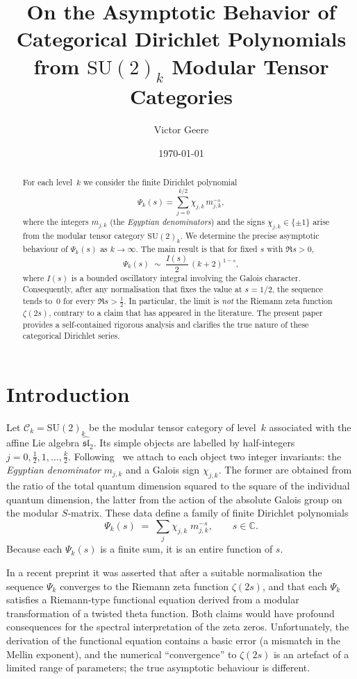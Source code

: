 \documentclass[11pt,a4paper]{article}
\title{\bfseries On the Asymptotic Behavior of Categorical Dirichlet Polynomials\\[4pt]
\large from $\mathrm{SU}(2)_k$ Modular Tensor Categories}
\author{Victor Geere}
\date{\today}
\theoremstyle{definition}
\theoremstyle{remark}
\begin{document}
\maketitle

\begin{abstract}
For each level~$k$ we consider the finite Dirichlet polynomial
\[
\Psi_k(s)=\sum_{j=0}^{k/2}\chi_{j,k}\,m_{j,k}^{-s},
\]
where the integers $m_{j,k}$ (the \emph{Egyptian denominators}) and the signs $\chi_{j,k}\in\{\pm1\}$ arise from the modular tensor category $\mathrm{SU}(2)_k$.
We determine the precise asymptotic behaviour of $\Psi_k(s)$ as $k\to\infty$.
The main result is that for fixed $s$ with $\Re s>0$,
\[
\Psi_k(s)\;\sim\; \frac{I(s)}{2}\,(k+2)^{1-s},
\]
where $I(s)$ is a bounded oscillatory integral involving the Galois character.
Consequently, after any normalisation that fixes the value at $s=1/2$, the sequence tends to~$0$ for every $\Re s>\tfrac12$.
In particular, the limit is \emph{not} the Riemann zeta function $\zeta(2s)$,
contrary to a claim that has appeared in the literature.
The present paper provides a self‑contained rigorous analysis and clarifies the true nature of these categorical Dirichlet series.
\end{abstract}

\section{Introduction}

Let $\mathcal{C}_k=\mathrm{SU}(2)_k$ be the modular tensor category of level~$k$ associated with the affine Lie algebra $\widehat{\mathfrak{sl}}_2$.
Its simple objects are labelled by half‑integers $j=0,\frac12,1,\dots,\frac{k}{2}$.
Following~\cite{huang} we attach to each object two integer invariants: the \emph{Egyptian denominator} $m_{j,k}$ and a Galois sign $\chi_{j,k}$.
The former are obtained from the ratio of the total quantum dimension squared to the square of the individual quantum dimension,
the latter from the action of the absolute Galois group on the modular $S$‑matrix.
These data define a family of finite Dirichlet polynomials
\begin{equation}\label{def:Psi}
\Psi_k(s) \;=\; \sum_{j} \chi_{j,k}\; m_{j,k}^{-s},
\qquad s\in\mathbb C .
\end{equation}
Because each $\Psi_k(s)$ is a finite sum, it is an entire function of $s$.

In a recent preprint it was asserted that after a suitable normalisation the sequence $\Psi_k$ converges to the Riemann zeta function $\zeta(2s)$, and that each $\Psi_k$ satisfies a Riemann‑type functional equation derived from a modular transformation of a twisted theta function.
Both claims would have profound consequences for the spectral interpretation of the zeta zeros.
Unfortunately, the derivation of the functional equation contains a basic error (a mismatch in the Mellin exponent),
and the numerical ``convergence'' to $\zeta(2s)$ is an artefact of a limited range of parameters;
the true asymptotic behaviour is different.
\end{document}
